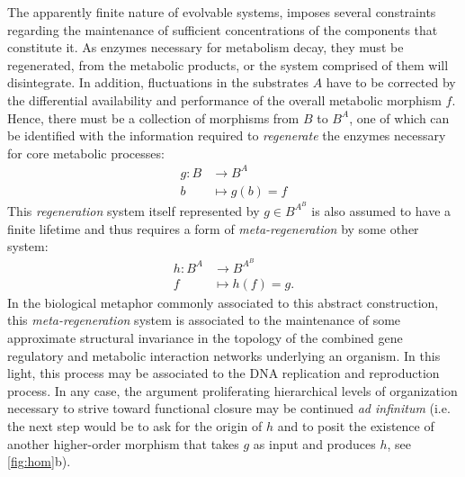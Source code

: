 The apparently finite nature of evolvable systems, imposes several constraints regarding the maintenance of sufficient concentrations of the components that constitute it. As enzymes necessary for metabolism decay, they must be regenerated, from the metabolic products, or the system comprised of them will disintegrate. In addition, fluctuations in the substrates $A$ have to be corrected by the differential availability and performance of the overall metabolic morphism $f$. Hence, there must be a collection of morphisms from $B$ to $B^A$, one of which can be identified with the information required to \emph{regenerate} the enzymes necessary for core metabolic processes:
\begin{align*}
g \colon B &\longrightarrow B^A\\
b &\longmapsto g(b)=f
\end{align*}
This \emph{regeneration} system itself represented by $g \in B^{A^B}$ is also assumed to have a finite lifetime and thus requires a form of \emph{meta-regeneration} by some other system:
\begin{align*}
h \colon B^A & \longrightarrow B^{A^B}\\
f & \longmapsto h(f)=g.
\end{align*}
In the biological metaphor commonly associated to this abstract construction, this \emph{meta-regeneration} system is associated to the maintenance of some approximate structural invariance in the topology of the combined gene regulatory and metabolic interaction networks underlying an organism. In this light, this process may be associated to the DNA replication and reproduction process. In any case, the argument proliferating hierarchical levels of organization necessary to strive toward functional closure may be continued \emph{ad infinitum} (i.e. the next step would be to ask for the origin of $h$ and to posit the existence of another higher-order morphism that takes $g$ as input and produces $h$, see \ref{fig:hom}b).

